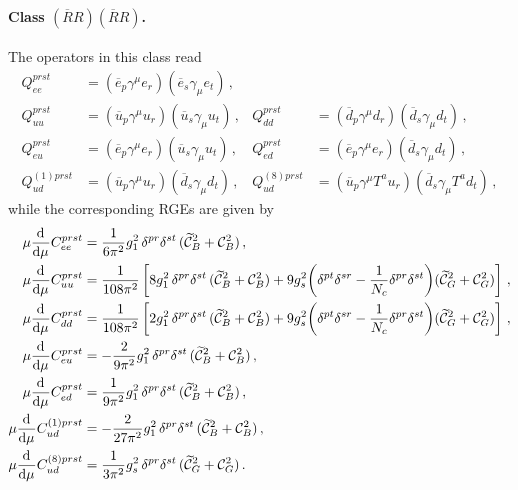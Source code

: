 \paragraph{\texorpdfstring{Class $(\overline{R}R)(\overline{R}R)$}{Class (Rbar R)(Rbar R)}.}
The operators in this class read
\begin{align}
Q_{ee}^{prst} &= (\overline{e}_p \gamma^\mu e_r)(\overline{e}_s \gamma_\mu e_t)\,, && \\ Q_{uu}^{prst} &= (\overline{u}_p \gamma^\mu u_r)(\overline{u}_s \gamma_\mu u_t)\,, & Q_{dd}^{prst} &= (\overline{d}_p \gamma^\mu d_r)(\overline{d}_s \gamma_\mu d_t)\,, \\
Q_{eu}^{prst} &= (\overline{e}_p \gamma^\mu e_r)(\overline{u}_s \gamma_\mu u_t)\,, & Q_{ed}^{prst} &= (\overline{e}_p \gamma^\mu e_r)(\overline{d}_s \gamma_\mu d_t)\,,\\
Q_{ud}^{(1)prst} &= (\overline{u}_p \gamma^\mu u_r)(\overline{d}_s \gamma_\mu d_t)\,, & Q_{ud}^{(8)prst} &= (\overline{u}_p \gamma^\mu T^a u_r)(\overline{d}_s \gamma_\mu T^a d_t)\,,
\end{align}
while the corresponding RGEs are given by
\begin{align}
    \mu \dv[]{}{\mu}{C}_{ee}^{prst} &=\frac{1}{6\pi^2}  g_1^2\, \delta^{pr}\delta^{st}\,(\widetilde{\mathcal{C}}_{B}^2 + \mathcal{C}_{B}^2)\, , \\
    \mu \dv[]{}{\mu}{C}_{uu}^{prst} &=\frac{1}{108\pi^2}\left[  8g_1^2\, \delta^{pr}\delta^{st}\,(\widetilde{\mathcal{C}}_{B}^2 + \mathcal{C}_{B}^2) +9g_s^2\bigg(\delta^{pt}\delta^{sr}-\frac{1}{N_c} \delta^{pr}\delta^{st}\bigg)(\widetilde{\mathcal{C}}_{G}^2 + \mathcal{C}_{G}^2)\right]\, , \\
    \mu \dv[]{}{\mu}{C}_{dd}^{prst} &=\frac{1}{108\pi^2}\left[  2g_1^2\, \delta^{pr}\delta^{st}\,(\widetilde{\mathcal{C}}_{B}^2 + \mathcal{C}_{B}^2) +9g_s^2\bigg(\delta^{pt}\delta^{sr}-\frac{1}{N_c} \delta^{pr}\delta^{st}\bigg)(\widetilde{\mathcal{C}}_{G}^2 + \mathcal{C}_{G}^2)\right]\, , \\
    \mu \dv[]{}{\mu}{C}_{eu}^{prst} &=  -\frac{2}{9\pi^2}g_1^2\, \delta^{pr}\delta^{st}\,(\widetilde{\mathcal{C}}_{B}^2 + \mathcal{C}_{B}^2)\, , \\
    \mu \dv[]{}{\mu}{C}_{ed}^{prst} &=  \frac{1}{9\pi^2}g_1^2\, \delta^{pr}\delta^{st}\,(\widetilde{\mathcal{C}}_{B}^2 + \mathcal{C}_{B}^2)\, , \\
    \mu \dv[]{}{\mu}{C}_{ud}^{(1)prst} &=  -\frac{2}{27\pi^2}g_1^2\, \delta^{pr}\delta^{st}\,(\widetilde{\mathcal{C}}_{B}^2 + \mathcal{C}_{B}^2)\, , \\
    \mu \dv[]{}{\mu}{C}_{ud}^{(8)prst} &=  \frac{1}{3\pi^2}g_s^2\,\delta^{pr}\delta^{st}\,(\widetilde{\mathcal{C}}_{G}^2 + \mathcal{C}_{G}^2) \,.
\end{align}

